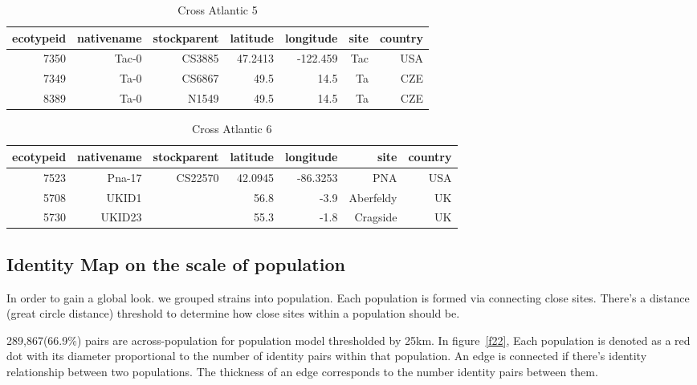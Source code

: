 \documentclass[a4paper,10pt]{article}
\begin{document}
\begin{table}
\caption{Cross Atlantic 5}
\begin{tabular}{|r|r|r|r|r|r|r|}
\hline
ecotypeid & nativename & stockparent & latitude & longitude & site & country\\
\hline
7350 & Tac-0      & CS3885      &  47.2413 &  -122.459 & Tac  & USA \\
7349 & Ta-0       & CS6867      &     49.5 &      14.5 & Ta   & CZE \\
8389 & Ta-0       & N1549       &     49.5 &      14.5 & Ta   & CZE \\
\hline
\end{tabular}
\label{thap_6}
\end{table}

\begin{table}
\caption{Cross Atlantic 6}
\begin{tabular}{|r|r|r|r|r|r|r|}
\hline
ecotypeid & nativename & stockparent & latitude & longitude & site & country\\
\hline
7523 & Pna-17     & CS22570     &  42.0945 &  -86.3253 & PNA       & USA \\
5708 & UKID1      &             &     56.8 &      -3.9 & Aberfeldy & UK  \\
5730 & UKID23     &             &     55.3 &      -1.8 & Cragside  & UK  \\
\hline
\end{tabular}
\label{thap_7}
\end{table}

\subsection{Identity Map on the scale of population}
In order to gain a global look. we grouped strains into population. Each population is formed via connecting close sites. There's a distance (great circle distance) threshold to determine how close sites within a population should be.

289,867(66.9\%) pairs are across-population for population model thresholded by 25km. In figure~\ref{f22}, Each population is denoted as a red dot with its diameter proportional to the number of identity pairs within that population. An edge is connected if there's identity relationship between two populations. The thickness of an edge corresponds to the number identity pairs between them.
\end{document}
